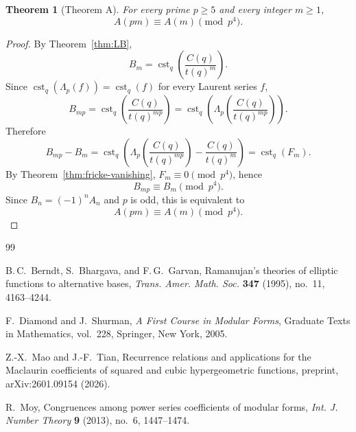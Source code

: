 \documentclass[11pt]{amsart}
\newtheorem{theorem}{Theorem}[section]
\theoremstyle{remark}
\DeclareMathOperator{\cst}{cst}
\begin{document}
\begin{theorem}[Theorem A]\label{thm:super}
For every prime $p\ge5$ and every integer $m\ge1$,
\[
A(pm)\equiv A(m)\pmod{p^4}.
\]
\end{theorem}

\begin{proof}
By Theorem~\ref{thm:LB},
\[
B_m=\cst_q\!\left(\frac{C(q)}{t(q)^m}\right).
\]
Since $\cst_q(\Lambda_p(f))=\cst_q(f)$ for every Laurent series $f$,
\[
B_{mp}
=
\cst_q\!\left(\frac{C(q)}{t(q)^{mp}}\right)
=
\cst_q\!\left(\Lambda_p\!\left(\frac{C(q)}{t(q)^{mp}}\right)\right).
\]
Therefore
\[
B_{mp}-B_m
=
\cst_q\!\left(
\Lambda_p\!\left(\frac{C(q)}{t(q)^{mp}}\right)-\frac{C(q)}{t(q)^m}
\right)
=
\cst_q(F_m).
\]
By Theorem~\ref{thm:fricke-vanishing}, $F_m\equiv0\pmod{p^4}$, hence
\[
B_{mp}\equiv B_m\pmod{p^4}.
\]
Since $B_n=(-1)^nA_n$ and $p$ is odd, this is equivalent to
\[
A(pm)\equiv A(m)\pmod{p^4}.
\]
\end{proof}

\begin{thebibliography}{99}

B.\,C.~Berndt, S.~Bhargava, and F.\,G.~Garvan,
Ramanujan's theories of elliptic functions to alternative bases,
\emph{Trans. Amer. Math. Soc.} \textbf{347} (1995), no.~11, 4163--4244.

F.~Diamond and J.~Shurman,
\emph{A First Course in Modular Forms},
Graduate Texts in Mathematics, vol.~228, Springer, New York, 2005.

Z.-X.~Mao and J.-F.~Tian,
Recurrence relations and applications for the Maclaurin coefficients of squared and cubic hypergeometric functions,
preprint, arXiv:2601.09154 (2026).

R.~Moy,
Congruences among power series coefficients of modular forms,
\emph{Int. J. Number Theory} \textbf{9} (2013), no.~6, 1447--1474.

\end{thebibliography}
\end{document}
